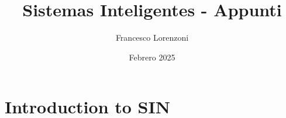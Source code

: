 


\title{Sistemas Inteligentes - Appunti}
\author{Francesco Lorenzoni}
\date{Febrero 2025}


\makeatletter
\renewcommand{\l@section}{\@dottedtocline{1}{1.5em}{2.6em}}
\renewcommand{\l@subsection}{\@dottedtocline{2}{2.5em}{3.6em}}
\renewcommand{\l@subsubsection}{\@dottedtocline{3}{3.5em}{4.5em}}
\makeatother
{} %



\doparttoc[n]

\maketitle
\tableofcontents

\part{Introduction to SIN}
\parttoc







